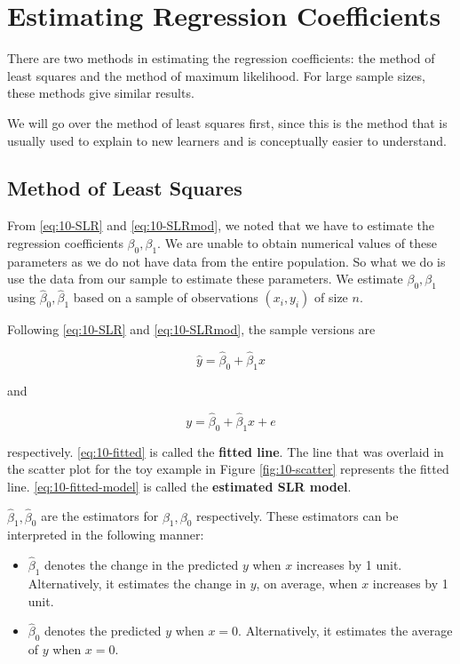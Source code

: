 \documentclass[
]{book}
\providecommand{\tightlist}{%
  \setlength{\itemsep}{0pt}\setlength{\parskip}{0pt}}
\begin{document}
\section{Estimating Regression Coefficients}\label{estimating-regression-coefficients}

There are two methods in estimating the regression coefficients: the method of least squares and the method of maximum likelihood. For large sample sizes, these methods give similar results.

We will go over the method of least squares first, since this is the method that is usually used to explain to new learners and is conceptually easier to understand.

\subsection{Method of Least Squares}\label{method-of-least-squares}

From \eqref{eq:10-SLR} and \eqref{eq:10-SLRmod}, we noted that we have to estimate the regression coefficients \(\beta_0, \beta_1\). We are unable to obtain numerical values of these parameters as we do not have data from the entire population. So what we do is use the data from our sample to estimate these parameters. We estimate \(\beta_0,\beta_1\) using \(\hat{\beta}_0,\hat{\beta}_1\) based on a sample of observations \((x_i,y_i)\) of size \(n\).

Following \eqref{eq:10-SLR} and \eqref{eq:10-SLRmod}, the sample versions are

\begin{equation} 
\hat{y}=\hat{\beta}_0+\hat{\beta}_1 x
\label{eq:10-fitted}
\end{equation}

and

\begin{equation} 
y=\hat{\beta}_0+\hat{\beta}_1 x + e
\label{eq:10-fitted-model}
\end{equation}

respectively. \eqref{eq:10-fitted} is called the \textbf{fitted line}. The line that was overlaid in the scatter plot for the toy example in Figure \ref{fig:10-scatter} represents the fitted line. \eqref{eq:10-fitted-model} is called the \textbf{estimated SLR model}.

\(\hat{\beta}_1,\hat{\beta}_0\) are the estimators for \(\beta_1,\beta_0\) respectively. These estimators can be interpreted in the following manner:

\begin{itemize}
\tightlist
\item
  \(\hat{\beta}_1\) denotes the change in the predicted \(y\) when \(x\) increases by 1 unit. Alternatively, it estimates the change in \(y\), on average, when \(x\) increases by 1 unit.
\item
  \(\hat{\beta}_0\) denotes the predicted \(y\) when \(x=0\). Alternatively, it estimates the average of \(y\) when \(x=0\).
\end{itemize}
\end{document}

